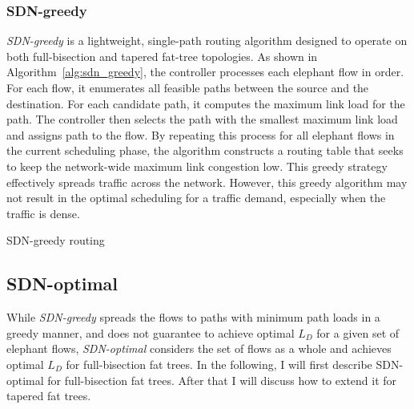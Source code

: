 \subsubsection{SDN-greedy}

\textit{SDN-greedy} is a lightweight, single-path routing algorithm
designed to operate on both full-bisection and tapered fat-tree
topologies. As shown in Algorithm~\ref{alg:sdn_greedy}, the controller
processes each elephant flow in order. For each flow, it enumerates
all feasible paths between the source and the destination. For each
candidate path, it computes the maximum link load for the path.
The controller then selects the path with the smallest maximum link load
and assigns path to the flow.
By repeating this process for all elephant flows in the current
scheduling phase, the algorithm constructs a routing table that seeks
to keep the network-wide maximum link congestion low. This greedy
strategy effectively spreads traffic across the network. However, this
greedy algorithm may not result in the optimal scheduling for a
traffic demand, especially when the traffic is dense. 

\begin{algorithm}[H]
\DontPrintSemicolon
\caption{SDN-greedy routing}
\label{alg:sdn_greedy}
\end{algorithm}

\subsection{SDN-optimal}

While \textit{SDN-greedy} spreads the flows to paths with minimum path
loads in a greedy manner, and does not guarantee to achieve optimal $L_D$ for
a given set of elephant flows, \textit{SDN-optimal} considers the set of flows
as a whole and achieves optimal $L_D$ for full-bisection fat trees.
In the following, I will first describe SDN-optimal for full-bisection fat
trees. After that I will discuss how to extend it for tapered fat trees. 

